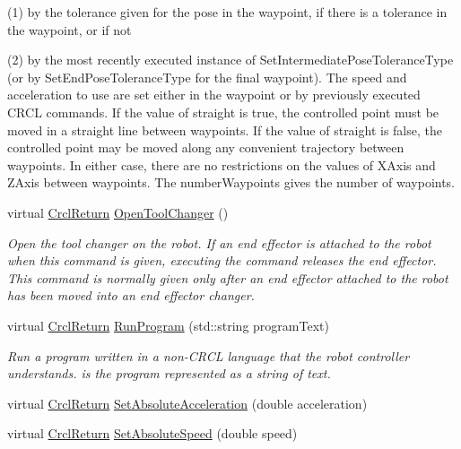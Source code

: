 \begin{DoxyCompactItemize}
\begin{DoxyCompactList}
 (1) by the tolerance given for the pose in the waypoint, if there is a tolerance in the waypoint, or if not \par
 (2) by the most recently executed instance of Set\-Intermediate\-Pose\-Tolerance\-Type (or by Set\-End\-Pose\-Tolerance\-Type for the final waypoint). The speed and acceleration to use are set either in the waypoint or by previously executed C\-R\-C\-L commands. If the value of straight is true, the controlled point must be moved in a straight line between waypoints. If the value of straight is false, the controlled point may be moved along any convenient trajectory between waypoints. In either case, there are no restrictions on the values of X\-Axis and Z\-Axis between waypoints. The number\-Waypoints gives the number of waypoints. \end{DoxyCompactList}\item 
virtual \hyperlink{namespaceCrcl_a1ed3b29723118a020251dde9b12733c0}{Crcl\-Return} \hyperlink{classCrcl_1_1CrclDelegateInterface_a0b78b935f64602c8543dd4cb6a6929ba}{Open\-Tool\-Changer} ()
\begin{DoxyCompactList}\small\item\em Open the tool changer on the robot. If an end effector is attached to the robot when this command is given, executing the command releases the end effector. This command is normally given only after an end effector attached to the robot has been moved into an end effector changer. \end{DoxyCompactList}\item 
virtual \hyperlink{namespaceCrcl_a1ed3b29723118a020251dde9b12733c0}{Crcl\-Return} \hyperlink{classCrcl_1_1CrclDelegateInterface_a524e770e96afe3fd89fd11d70e56cbe3}{Run\-Program} (std\-::string program\-Text)
\begin{DoxyCompactList}\small\item\em Run a program written in a non-\/\-C\-R\-C\-L language that the robot controller understands.  is the program represented as a string of text. \end{DoxyCompactList}\item 
virtual \hyperlink{namespaceCrcl_a1ed3b29723118a020251dde9b12733c0}{Crcl\-Return} \hyperlink{classCrcl_1_1CrclDelegateInterface_a723c774e71cac9c51fb8159d06e9ae1a}{Set\-Absolute\-Acceleration} (double acceleration)
\item 
virtual \hyperlink{namespaceCrcl_a1ed3b29723118a020251dde9b12733c0}{Crcl\-Return} \hyperlink{classCrcl_1_1CrclDelegateInterface_ad26647a78097ff9ee50e1abe285b7dbe}{Set\-Absolute\-Speed} (double speed)

\end{DoxyCompactItemize}
